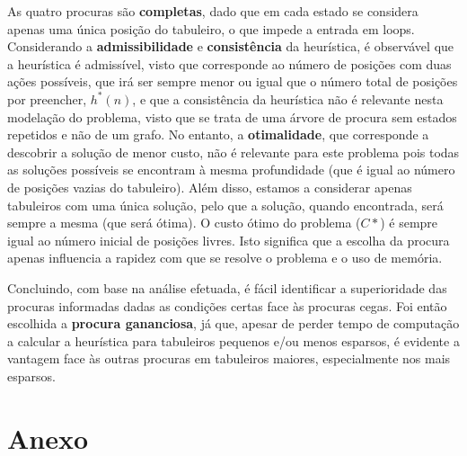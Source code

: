 \documentclass[12pt,a4paper]{article}
\begin{document}
As quatro procuras são \textbf{completas}, dado que em cada estado se considera apenas uma única posição do tabuleiro,
o que impede a entrada em loops.
Considerando a \textbf{admissibilidade} e \textbf{consistência} da heurística, é observável que
a heurística é admissível, visto que corresponde ao número de posições com duas ações possíveis, que
irá ser sempre menor ou igual que o número total de posições por preencher, \(h^*(n)\), e que a 
consistência da heurística não é relevante nesta modelação do problema, visto que se trata de uma árvore de procura 
sem estados repetidos e não de um grafo.
No entanto, a \textbf{otimalidade}, que corresponde a descobrir a solução de menor custo,
não é relevante para este problema pois todas as soluções possíveis se encontram à mesma profundidade
(que é igual ao número de posições vazias do tabuleiro).
Além disso, estamos a considerar apenas tabuleiros com uma única solução,
pelo que a solução, quando encontrada, será sempre a mesma (que será ótima).
O custo ótimo do problema (\(C*\)) é sempre igual ao número inicial de posições livres.
Isto significa que a escolha da procura apenas influencia a rapidez com que se resolve o problema e o uso de memória.

Concluindo, com base na análise efetuada, é fácil identificar a superioridade das procuras informadas dadas as
condições certas face às procuras cegas. Foi então escolhida a \textbf{procura gananciosa}, já que,
apesar de perder tempo de computação a calcular a heurística para tabuleiros pequenos e/ou menos esparsos,
é evidente a vantagem face às outras procuras em tabuleiros maiores, especialmente nos mais
esparsos.

\clearpage

\section*{Anexo}
\end{document}
